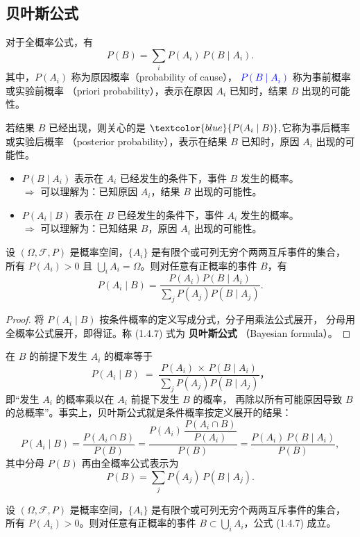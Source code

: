 \subsection{贝叶斯公式}
对于全概率公式，有
\[
P(B) = \sum_i P(A_i)\, P(B \mid A_i).
\]
其中，$P(A_i)$ 称为原因概率（probability of cause），
\textcolor{blue}{\(P(B \mid A_i)\)} 称为事前概率或实验前概率
（priori probability），表示在原因 $A_i$ 已知时，结果 $B$ 出现的可能性。

若结果 $B$ 已经出现，则关心的是
$
\textcolor{blue}{P(A_i \mid B)},
$它称为事后概率或实验后概率
（posterior probability），表示在结果 $B$ 已知时，原因 $A_i$ 出现的可能性。

\begin{dxtips}
    \begin{itemize}
  \item $P(B \mid A_i)$ 表示在 $A_i$ 已经发生的条件下，事件 $B$ 发生的概率。\\
  \quad $\Rightarrow$ 可以理解为：已知原因 $A_i$，结果 $B$ 出现的可能性。
  
  \item $P(A_i \mid B)$ 表示在 $B$ 已经发生的条件下，事件 $A_i$ 发生的概率。\\
  \quad $\Rightarrow$ 可以理解为：已知结果 $B$，原因 $A_i$ 出现的可能性。
\end{itemize}
\end{dxtips}
\begin{theorem}[贝叶斯公式]
设 $(\Omega, \mathcal{F}, P)$ 是概率空间，$\{A_i\}$ 是有限个或可列无穷个两两互斥事件的集合，
所有 $P(A_i) > 0$ 且 $\bigcup_i A_i = \Omega$。则对任意有正概率的事件 $B$，有
\begin{equation}
    P(A_i \mid B) = \frac{P(A_i) P(B \mid A_i)}{\sum\limits_j P(A_j) P(B \mid A_j)}.
    \tag{1.4.7}
\end{equation}
\end{theorem}

\begin{proof}
将 $P(A_i \mid B)$ 按条件概率的定义写成分式，分子用乘法公式展开，
分母用全概率公式展开，即得证。称 (1.4.7) 式为 \textbf{贝叶斯公式}
（Bayesian formula）。
\end{proof}
\begin{dxtips}
    在 $B$ 的前提下发生 $A_i$ 的概率等于
\[
P(A_i \mid B) \;=\;
\frac{P(A_i)\,\times\,P(B \mid A_i)}{\sum_j P(A_j)P(B \mid A_j)}，
\]
即“发生 $A_i$ 的概率乘以在 $A_i$ 前提下发生 $B$ 的概率，
再除以所有可能原因导致 $B$ 的总概率”。事实上，贝叶斯公式就是条件概率按定义展开的结果：
\[
P(A_i \mid B) = \frac{P(A_i \cap B)}{P(B)}
= \frac{P(A_i)\,\dfrac{P(A_i \cap B)}{P(A_i)}}{P(B)}
= \frac{P(A_i)\,P(B \mid A_i)}{P(B)},
\]
其中分母 $P(B)$ 再由全概率公式表示为
\[
P(B) = \sum_j P(A_j)\,P(B \mid A_j).
\]
\end{dxtips}
\begin{corollary}[只要求 $B \subset \bigcup_i A_i$，并不强制 $\bigcup_i A_i = \Omega$]
设 $(\Omega, \mathcal{F}, P)$ 是概率空间，$\{A_i\}$ 是有限个或可列无穷个两两互斥事件的集合，
所有 $P(A_i) > 0$。则对任意有正概率的事件 $B \subset \bigcup_i A_i$，公式 (1.4.7) 成立。
\end{corollary}
